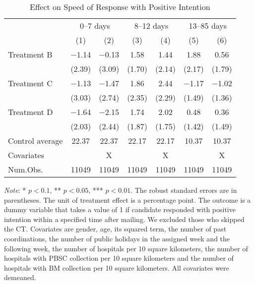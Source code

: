 \documentclass[12pt, a4paper]{article}
\begin{document}
\begin{table}[H]

\caption{\label{tab:lm-positive-time-decompose}Effect on Speed of Response with Positive Intention}
\centering
\fontsize{8}{10}\selectfont
\begin{threeparttable}
\begin{tabular}[t]{>{\raggedright\arraybackslash}p{20em}cccccc}
\toprule
\multicolumn{1}{c}{ } & \multicolumn{2}{c}{0--7 days} & \multicolumn{2}{c}{8--12 days} & \multicolumn{2}{c}{13--85 days} \\
\cmidrule(l{3pt}r{3pt}){2-3} \cmidrule(l{3pt}r{3pt}){4-5} \cmidrule(l{3pt}r{3pt}){6-7}
  & (1) & (2) & (3) & (4) & (5) & (6)\\
\midrule
Treatment B & \num{-1.14} & \num{-0.13} & \num{1.58} & \num{1.44} & \num{1.88} & \num{0.56}\\
 & (\num{2.39}) & (\num{3.09}) & (\num{1.70}) & (\num{2.14}) & (\num{2.17}) & (\num{1.79})\\
Treatment C & \num{-1.13} & \num{-1.47} & \num{1.86} & \num{2.44} & \num{-1.17} & \num{-1.02}\\
 & (\num{3.03}) & (\num{2.74}) & (\num{2.35}) & (\num{2.29}) & (\num{1.49}) & (\num{1.36})\\
Treatment D & \num{-1.64} & \num{-2.15} & \num{1.74} & \num{2.02} & \num{0.48} & \num{0.36}\\
 & (\num{2.03}) & (\num{2.44}) & (\num{1.87}) & (\num{1.75}) & (\num{1.42}) & (\num{1.49})\\
\midrule
Control average & 22.37 & 22.37 & 22.17 & 22.17 & 10.37 & 10.37\\
Covariates &  & X &  & X &  & X\\
Num.Obs. & \num{11049} & \num{11049} & \num{11049} & \num{11049} & \num{11049} & \num{11049}\\
\bottomrule
\end{tabular}
\begin{tablenotes}
\item \emph{Note}: * $p < 0.1$, ** $p < 0.05$, *** $p < 0.01$. The robust standard errors are in parentheses. The unit of treatment effect is a percentage point. The outcome is a dummy variable that takes a value of 1 if candidate responded with positive intention within a specified time after mailing. We excluded those who skipped the CT. Covariates are gender, age, its squared term, the number of past coordinations, the number of public holidays in the assigned week and the following week, the number of hospitals per 10 square kilometers, the number of hospitals with PBSC collection per 10 square kilometers and the number of hospitals with BM collection per 10 square kilometers. All covariates were demeaned.
\end{tablenotes}
\end{threeparttable}
\end{table}
\end{document}
